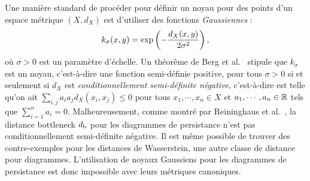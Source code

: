 %

Une mani\`ere standard de proc\'eder pour d\'efinir un noyau pour des points d'un espace m\'etrique $(X,d_X)$
est d'utiliser des fonctions {\em Gaussiennes} : 
$$k_\sigma(x,y)={\rm exp}\left(-\frac{d_X(x,y)}{2\sigma^2}\right),$$
o\`u $\sigma>0$ est un param\`etre d'\'echelle. Un th\'eor\^eme de Berg et al.~\cite{Berg84} stipule que  
$k_\sigma$ est un noyau, c'est-\`a-dire une fonction semi-d\'efinie positive, pour tous  $\sigma>0$
si et seulement si $d_X$ est {\em conditionnellement semi-d\'efinite n\'egative}, c'est-\`a-dire est telle qu'on ait 
$\sum_{i,j}a_ia_jd_X(x_i,x_j)\leq 0$ pour tous $x_1,\cdots,x_n\in X$ et $a_1,\cdots,a_n\in\mathbb{R}$ tels que $\sum_{i=1}^n a_i=0$.
Malheureusement, comme montr\'e par Reininghaus et al.~\cite{Reininghaus14}, %
la distance bottleneck $d_{\rm b}$ pour les diagrammes de persistance n'est pas conditionnellement semi-d\'efinite n\'egative. Il est m\^eme possible de trouver
des contre-exemples pour les distances de Wasserstein,
une autre classe de distance pour diagrammes. L'utilisation de noyaux Gaussiens pour les diagrammes de persistance est donc impossible
avec leurs m\'etriques canoniques. 

